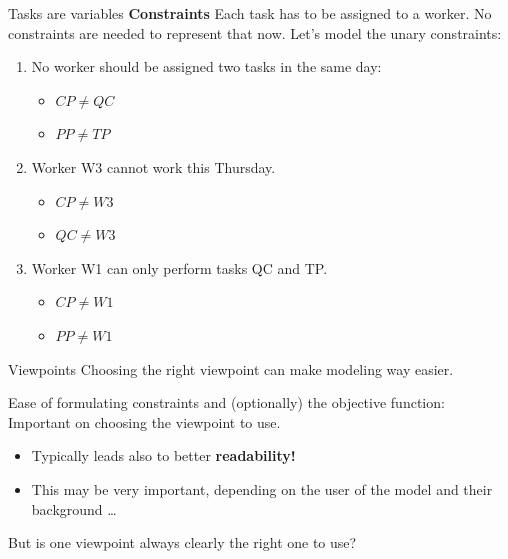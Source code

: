 \documentclass{cons-beamer}
\begin{document}
\begin{frame}{Tasks are variables}
  \textbf{Constraints} Each task has to be assigned to a worker. No constraints are needed to represent that now. Let's model the unary constraints:
  \vfill

  \begin{enumerate}
    \item No worker should be assigned two tasks in the same day:
          \begin{itemize}
            \item $CP \neq QC$
            \item $PP \neq TP$
          \end{itemize}
          \vfill

    \item Worker W3 cannot work this Thursday. 
          \begin{itemize}
            \item $CP \neq W3$
            \item $QC \neq W3$
          \end{itemize}
          \vfill

    \item Worker W1 can only perform tasks QC and TP. 
          \begin{itemize}
            \item $CP \neq W1$
            \item $PP \neq W1$
          \end{itemize}
  \end{enumerate}
\end{frame}

\begin{frame}{Viewpoints}
  Choosing the right viewpoint can make modeling way easier.
  \vfill

  Ease of formulating constraints and (optionally) the objective function: Important on choosing the viewpoint to use.
  \vfill

  \begin{itemize}
    \item Typically leads also to better \textbf{readability!}
    \item This may be very important, depending on the user of the model and their background \dots
  \end{itemize}
  \vfill

  \alert{But is one viewpoint always clearly the right one to use?}
\end{frame}
\end{document}
